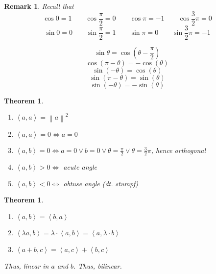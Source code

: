 \documentclass[a4paper]{article}
\newcounter{lecref}[section]
\numberwithin{lecref}{section}
\newtheorem{theorem}[lecref]{Theorem}
\newtheorem*{Remark}{Remark}
\newcommand{\angel}[1]{\left\langle#1\right\rangle}
\newcommand{\norm}[1]{\left\|#1\right\|}
\begin{document}
\begin{Remark}
  Recall that
  \[ \cos{0} = 1 \qquad \cos{\frac\pi2} = 0 \qquad \cos{\pi} = -1 \qquad \cos{\frac32 \pi} = 0 \]
  \[ \sin{0} = 0 \qquad \sin{\frac\pi2} = 1 \qquad \sin{\pi} = 0 \qquad \sin{\frac32 \pi} = -1 \]

  \[ \sin\theta = \cos(\theta - \frac\pi2) \]
  \[ \cos(\pi - \theta) = -\cos(\theta) \]
  \[ \sin(-\theta) = \cos(\theta) \]
  \[ \sin(\pi - \theta) = \sin(\theta) \]
  \[ \sin(-\theta) = -\sin(\theta) \]
\end{Remark}

\begin{theorem} %
  \begin{enumerate}
    \item $\angel{a,a} = \norm{a}^2$
    \item $\angel{a,a} = 0 \iff a = 0$
    \item $\angel{a,b} = 0 \iff a = 0 \lor b = 0 \lor \theta = \frac\pi2 \lor \theta = \frac32 \pi$, hence orthogonal
    \item $\angel{a,b} > 0 \iff$ acute angle
    \item $\angel{a,b} < 0 \iff$ obtuse angle (dt. \foreignlanguage{german}{stumpf})
  \end{enumerate}
\end{theorem}

\begin{theorem} %
  \label{satz83}
  \begin{enumerate}
    \item $\angel{a,b} = \angel{b,a}$
    \item $\angel{\lambda a, b} = \lambda \cdot \angel{a, b} = \angel{a, \lambda \cdot b}$
    \item $\angel{a+b, c} = \angel{a,c} + \angel{b, c}$
  \end{enumerate}
  Thus, linear in $a$ and $b$. Thus, bilinear.
\end{theorem}
\end{document}
